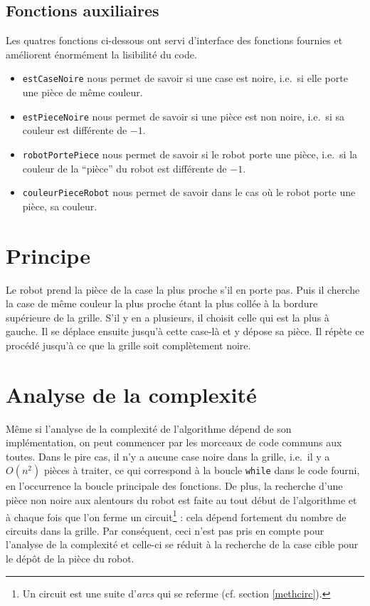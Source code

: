 \documentclass[12pt,a4paper]{article}
\begin{document}
\subsection*{Fonctions auxiliaires}
Les quatres fonctions ci-dessous ont servi d'interface des fonctions fournies 
et am\'eliorent \'enorm\'ement la lisibilit\'e du code. 
\begin{itemize}
  \item \texttt{estCaseNoire} nous permet de savoir si une case est 
  noire, i.e.\ si elle porte une pi\`ece de m\^eme couleur.
  \item \texttt{estPieceNoire} nous permet de savoir si une pi\`ece 
  est non noire, i.e.\ si sa couleur est diff\'erente de $-1$.
  \item \texttt{robotPortePiece} nous permet de savoir si le robot 
  porte une pi\`ece, i.e.\ si la couleur de la ``pi\`ece'' du robot est 
  diff\'erente de $-1$.
  \item \texttt{couleurPieceRobot} nous permet de savoir dans le 
cas o\`u le robot porte une pi\`ece, sa couleur.
\end{itemize}

\section{Principe}
Le robot prend la pi\`ece de la case la plus proche s'il en porte pas. Puis il 
cherche la case de m\^eme couleur la plus proche \'etant la plus coll\'ee \`a 
la bordure sup\'erieure de la grille. S'il y en a plusieurs, il choisit 
celle qui est la plus \`a gauche. Il se d\'eplace ensuite jusqu'\`a cette 
case-l\`a et y d\'epose sa pi\`ece. Il r\'ep\`ete ce proc\'ed\'e jusqu'\`a ce 
que la grille soit compl\`etement noire.

\section{Analyse de la complexit\'e}
M\^eme si l'analyse de la complexit\'e de l'algorithme d\'epend de son 
impl\'ementation, on peut commencer par les morceaux de code communs aux toutes. 
Dans le pire cas, il n'y a aucune case noire dans la grille, i.e.\ il y a 
$O(n^2)$ pi\`eces \`a traiter, ce qui correspond \`a la boucle \texttt{while} 
dans le code fourni, en l'occurrence la boucle principale des fonctions. De 
plus, la recherche d'une pi\`ece non noire aux alentours du robot est faite au 
tout d\'ebut de l'algorithme et \`a chaque fois que l'on ferme un 
circuit\footnote{Un circuit est une suite d'{\itshape arcs} qui se referme 
(cf. section \ref{methcirc}).} : cela d\'epend fortement du nombre de circuits 
dans la grille. Par cons\'equent, ceci n'est pas pris en compte pour l'analyse 
de la complexit\'e et celle-ci se r\'eduit \`a la recherche de la case cible 
pour le d\'ep\^ot de la pi\`ece du robot. 
\end{document}

